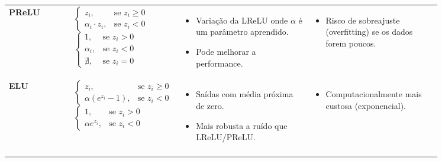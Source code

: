\begin{longtable}{@{} l p{0.25\linewidth} p{0.3\linewidth} p{0.3\linewidth} @{}}
    \textbf{PReLU} &
    $ \begin{cases}z_i, & \text{se } z_i \ge 0 \\ \alpha_i \cdot z_i, & \text{se } z_i < 0\end{cases} $ \newline\vspace{0.2cm}
    $\begin{cases}1, & \text{se } z_i > 0 \\ \alpha_i, & \text{se } z_i < 0 \\ \nexists, & \text{se } z_i = 0\end{cases}$
    &
    \begin{itemize}[noitemsep, topsep=0pt, partopsep=0pt, leftmargin=*]
        \item Variação da LReLU onde $\alpha$ é um parâmetro aprendido.
        \item Pode melhorar a performance.
    \end{itemize}
    &
    \begin{itemize}[noitemsep, topsep=0pt, partopsep=0pt, leftmargin=*]
        \item Risco de sobreajuste (overfitting) se os dados forem poucos.
    \end{itemize}
    \\ \addlinespace

    \textbf{ELU} &
    $\begin{cases}z_i, & \text{se } z_i \ge 0 \\ \alpha (e^{z_i} - 1) , & \text{se } z_i < 0\end{cases}$ \newline\vspace{0.2cm}
    $ \begin{cases}1, & \text{se } z_i > 0 \\ \alpha e^{z_i}, & \text{se } z_i < 0 \end{cases}$
    &
    \begin{itemize}[noitemsep, topsep=0pt, partopsep=0pt, leftmargin=*]
        \item Saídas com média próxima de zero.
        \item Mais robusta a ruído que LReLU/PReLU.
    \end{itemize}
    &
    \begin{itemize}[noitemsep, topsep=0pt, partopsep=0pt, leftmargin=*]
        \item Computacionalmente mais custosa (exponencial).
    \end{itemize}
    \\ \addlinespace


\end{longtable}
